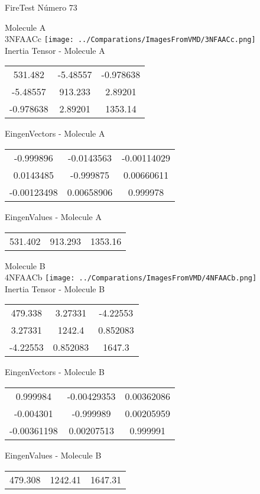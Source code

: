 \vtab[-2cm]
\begin{center}
{\large FireTest \tab Número 73}
\end{center}
\begin{multicols}{2}
\begin{center}

Molecule A \\ 
3NFAACc
\texttt{[image: ../Comparations/ImagesFromVMD/3NFAACc.png]}
\\
Inertia Tensor - Molecule A \\
\vtab

\begin{tabular}{|c c c|}
531.482	 & 	-5.48557	 & 	-0.978638	 \\
-5.48557	 & 	913.233	 & 	2.89201	 \\
-0.978638	 & 	2.89201	 & 	1353.14
\end{tabular}

\vtab
 EingenVectors - Molecule A     \\
\vtab
\begin{tabular}{|c c c|}
-0.999896	 & 	-0.0143563	 & 	-0.00114029	 \\
0.0143485	 & 	-0.999875	 & 	0.00660611	 \\
-0.00123498	 & 	0.00658906	 & 	0.999978
\end{tabular}

\vtab
 EingenValues - Molecule A     \\
\vtab
\begin{tabular}{|c c c|}
531.402	 & 	913.293	 & 	1353.16	 \\
\end{tabular}
\columnbreak

Molecule B \\ 
4NFAACb
\texttt{[image: ../Comparations/ImagesFromVMD/4NFAACb.png]}
\\
Inertia Tensor - Molecule B \\
\vtab

\begin{tabular}{|c c c|}
479.338	 & 	3.27331	 & 	-4.22553	 \\
3.27331	 & 	1242.4	 & 	0.852083	 \\
-4.22553	 & 	0.852083	 & 	1647.3
\end{tabular}

\vtab
 EingenVectors - Molecule B     \\
\vtab
\begin{tabular}{|c c c|}
0.999984	 & 	-0.00429353	 & 	0.00362086	 \\
-0.004301	 & 	-0.999989	 & 	0.00205959	 \\
-0.00361198	 & 	0.00207513	 & 	0.999991
\end{tabular}

\vtab
 EingenValues - Molecule B     \\
\vtab
\begin{tabular}{|c c c|}
479.308	 & 	1242.41	 & 	1647.31	 \\
\end{tabular}

\end{center}
\end{multicols}
